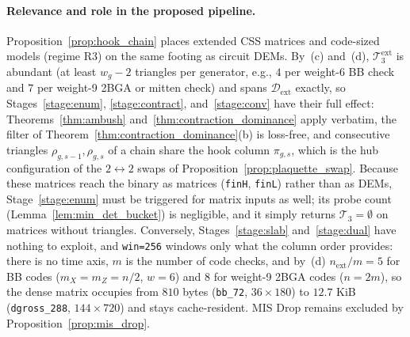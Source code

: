 \documentclass[12pt]{article}
\theoremstyle{definition}
\newcommand{\Dc}{\mathcal{D}}
\newcommand{\Tc}{\mathcal{T}_3}
\newcommand{\ttt}[1]{\texttt{#1}}
\begin{document}
\paragraph{Relevance and role in the proposed pipeline.}
Proposition~\ref{prop:hook_chain} places extended CSS matrices and code-sized models (regime R3) on the same footing
as circuit DEMs. By~(c) and~(d), $\Tc^{\mathrm{ext}}$ is abundant (at least $w_g - 2$ triangles per generator, e.g.,
$4$ per weight-6 BB check and $7$ per weight-9 2BGA or mitten check) and spans $\Dc_{\mathrm{ext}}$ exactly, so
Stages~\ref{stage:enum}, \ref{stage:contract}, and~\ref{stage:conv} have their full effect:
Theorems~\ref{thm:ambush} and~\ref{thm:contraction_dominance} apply verbatim, the filter of
Theorem~\ref{thm:contraction_dominance}(b) is loss-free, and consecutive triangles $\rho_{g,s-1}, \rho_{g,s}$ of a
chain share the hook column $\pi_{g,s}$, which is the hub configuration of the $2 \leftrightarrow 2$ swaps of
Proposition~\ref{prop:plaquette_swap}. Because these matrices reach the binary as matrices (\ttt{finH}, \ttt{finL})
rather than as DEMs, Stage~\ref{stage:enum} must be triggered for matrix inputs as well; its probe count
(Lemma~\ref{lem:min_det_bucket}) is negligible, and it simply returns $\Tc = \emptyset$ on matrices without triangles.
Conversely, Stages~\ref{stage:slab} and~\ref{stage:dual} have nothing to exploit, and \ttt{win=256} windows only what
the column order provides: there is no time axis, $m$ is the number of code checks, and by~(d) $n_{\mathrm{ext}}/m =
5$ for BB codes ($m_X = m_Z = n/2$, $w = 6$) and $8$ for weight-9 2BGA codes ($n = 2m$), so the dense matrix occupies
from $810$ bytes (\ttt{bb\_72}, $36 \times 180$) to $12.7$ KiB (\ttt{dgross\_288}, $144 \times 720$) and stays
cache-resident. MIS Drop remains excluded by Proposition~\ref{prop:mis_drop}.
\end{document}
